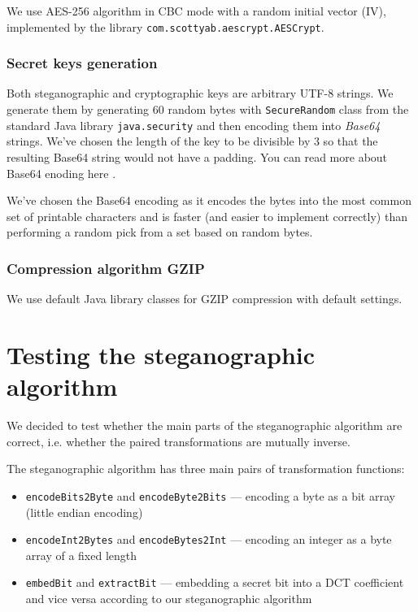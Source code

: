 We use AES-256 algorithm in CBC mode with a random initial vector (IV), implemented by 
the library \texttt{com.scottyab.aescrypt.AESCrypt}.

\subsubsection{Secret keys generation}
Both steganographic and cryptographic keys are arbitrary UTF-8 strings. We generate 
them by generating 60 random bytes with \texttt{SecureRandom} class from the standard
Java library \texttt{java.security} and then encoding them into \emph{Base64} strings.
We've chosen the length of the key to be divisible by $3$ so that the resulting
Base64 string would not have a padding. 
You can read more about Base64 enoding here \cite{josefsson2006base16}.

We've chosen the Base64 encoding as it encodes the bytes into the most common set
of printable characters and is faster (and easier to implement correctly) 
than performing a random pick from a set based on random bytes.

\subsubsection{Compression algorithm GZIP}

We use default Java library classes for GZIP compression with default settings.

\section{Testing the steganographic algorithm}

We decided to test whether the main parts of the steganographic algorithm
are correct, i.e. whether the paired transformations are mutually inverse.

The steganographic algorithm has three main pairs of transformation functions:
\begin{itemize}
    \item \texttt{encodeBits2Byte} and \texttt{encodeByte2Bits} 
        --- encoding a byte as a bit array (little endian encoding)
    \item \texttt{encodeInt2Bytes} and \texttt{encodeBytes2Int}
        --- encoding an integer as a byte array of a fixed length
    \item \texttt{embedBit} and \texttt{extractBit} 
        --- embedding a secret bit into a DCT coefficient and vice versa
        according to our steganographic algorithm
\end{itemize}

